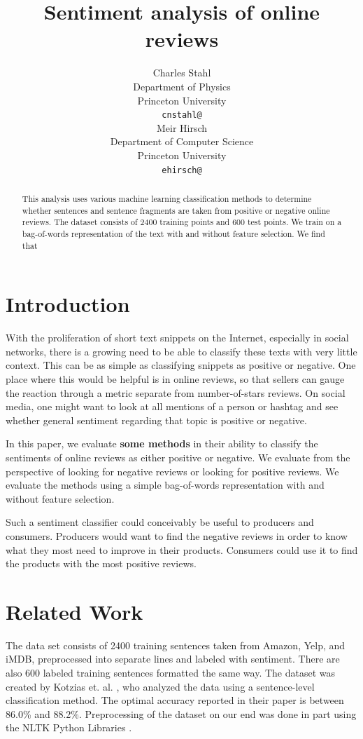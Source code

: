 \documentclass{article} %
\title{Sentiment analysis of online reviews}
\author{
	Charles Stahl\\
	Department of Physics\\
	Princeton University\\
	\texttt{cnstahl@} \\
	\And
	Meir Hirsch \\
	Department of Computer Science\\
	Princeton University \\
	\texttt{ehirsch@} \\
}
\begin{document}
	
	\maketitle
	
	\begin{abstract}
	This analysis uses various machine learning classification methods to determine whether sentences and sentence fragments are taken from positive or negative online reviews. The dataset consists of 2400 training points and 600 test points. We train on a bag-of-words representation of the text with and without feature selection. We find that
	\end{abstract}
	
	\section{Introduction}
	
	With the proliferation of short text snippets on the Internet, especially in social networks, there is a growing need to be able to classify these texts with very little context. This can be as simple as classifying snippets as positive or negative. One place where this would be helpful is in online reviews, so that sellers can gauge the reaction through a metric separate from number-of-stars reviews. On social media, one might want to look at all mentions of a person or hashtag and see whether general sentiment regarding that topic is positive or negative.
	
	In this paper, we evaluate {\bf some methods} in their ability to classify the sentiments of online reviews as either positive or negative. We evaluate from the perspective of looking for negative reviews or looking for positive reviews. We evaluate the methods using a simple bag-of-words representation with and without feature selection. 
	
	Such a sentiment classifier could conceivably be useful to producers and consumers. Producers would want to find the negative reviews in order to know what they most need to improve in their products. Consumers could use it to find the products with the most positive reviews.
	
	\section{Related Work}
	
	The data set consists of 2400 training sentences taken from Amazon, Yelp, and iMDB, preprocessed into separate lines and labeled with sentiment. There are also 600 labeled training sentences formatted the same way. The dataset was created by Kotzias et. al. \cite{Kotzias2015}, who analyzed the data using a sentence-level classification method. The optimal accuracy reported in their paper is between 86.0\% and 88.2\%. Preprocessing of the dataset on our end was done in part using the NLTK Python Libraries \cite{nltk}.
	
\end{document}

